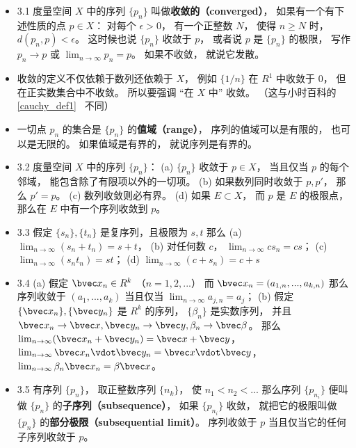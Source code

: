 \begin{itemize}
\item 3.1 度量空间 $X$ 中的序列 $\{p_n\}$ 叫做\textbf{收敛的（converged）}， 如果有一个有下述性质的点 $p\in X$： 对每个 $\epsilon > 0$， 有一个正整数 $N$， 使得 $n \geqslant N$ 时， $d(p_n,p) < \epsilon$。 这时候也说 $\{p_n\}$ 收敛于 $p$， 或者说 $p$ 是 $\{p_n\}$ 的极限， 写作 $p_n\to p$ 或 $\lim_{n\to \infty} p_n = p$。 如果不收敛， 就说它发散。

\item 收敛的定义不仅依赖于数列还依赖于 $X$， 例如 $\{1/n\}$ 在 $R^1$ 中收敛于 $0$， 但在正实数集合中不收敛。 所以要强调 “在 $X$ 中” 收敛。 （这与小时百科的\autoref{cauchy_def1}~ 不同）

\item 一切点 $p_n$ 的集合是 $\{p_n\}$ 的\textbf{值域（range）}， 序列的值域可以是有限的， 也可以是无限的。 如果值域是有界的， 就说序列是有界的。

\item 3.2 度量空间 $X$ 中的序列 $\{p_n\}$： (a) $\{p_n\}$ 收敛于 $p\in X$， 当且仅当 $p$ 的每个邻域， 能包含除了有限项以外的一切项。 (b) 如果数列同时收敛于 $p, p'$， 那么 $p' = p$。 (c) 数列收敛则必有界。 (d) 如果 $E \subset X$， 而 $p$ 是 $E$ 的极限点， 那么在 $E$ 中有一个序列收敛到 $p$。

\item 3.3 假定 $\{s_n\}, \{t_n\}$ 是复序列，且极限为 $s, t$ 那么 (a) $\lim_{n\to\infty} (s_n+t_n) = s+t$， (b) 对任何数 $c$， $\lim_{n\to\infty}cs_n = cs$； (c) $\lim_{n\to\infty}(s_n t_n) = st$； (d) $\lim_{n\to\infty} (c+s_n) = c+s$

\item 3.4 (a) 假定 $\bvec x_n \in R^k$ （$n=1,2,...$） 而 $\bvec x_n = (a_{1,n}, ...,a_{k,n})$ 那么序列收敛于 $(a_1,...,a_k)$ 当且仅当 $\lim_{n\to\infty} a_{j,n} = a_j$； (b) 假定 $\{\bvec x_n\}, \{\bvec y_n\}$ 是 $R^k$ 的序列， $\{\beta_n\}$ 是实数序列， 并且 $\bvec x_n\to \bvec x, \bvec y_n\to \bvec y, \beta_n\to\bvec \beta$。 那么 $\lim_{n\to\infty} (\bvec x_n+\bvec y_n) = \bvec x+\bvec y$， $\lim_{n\to\infty} \bvec x_n \vdot \bvec y_n = \bvec x \vdot \bvec y$， $\lim_{n\to\infty} \beta_n \bvec x_n = \beta \bvec x$。

\item 3.5 有序列 $\{p_n\}$， 取正整数序列 $\{n_k\}$， 使 $n_1<n_2<...$ 那么序列 $\{p_{n_i}\}$ 便叫做 $\{p_n\}$ 的\textbf{子序列（subsequence）}， 如果 $\{p_{n_i}\}$ 收敛， 就把它的极限叫做 $\{p_n\}$ 的\textbf{部分极限（subsequential limit）}。 序列收敛于 $p$ 当且仅当它的任何子序列收敛于 $p$。


\end{itemize}
